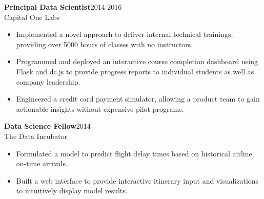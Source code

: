 \documentclass[11pt]{res}
\begin{document}
\begin{resume}
{\bf Principal Data Scientist}\hfill\mbox{2014-2016}\\
Capital One Labs
\vspace*{0.01 in}\begin{itemize} \itemsep -2pt 
  \item Implemented a novel approach to deliver internal technical
    trainings, providing over 5000 hours of classes with no instructors.
  \item Programmed and deployed an interactive course completion dashboard using Flask
    and dc.js to provide progress reports to individual students as
    well as company leadership.
  \item Engineered a credit card payment simulator, allowing a product team
    to gain actionable insights without expensive pilot programs.
  \end{itemize}
\vspace{-0.15in}

{\bf Data Science Fellow}\hfill\mbox{2014}\\
The Data Incubator
                  \vspace* {0.01 in}\begin{itemize} \itemsep -2pt
                    \item Formulated a model to predict flight
                      delay times based on
                      historical airline on-time arrivals.
                    \item Built a web interface to provide interactive itinerary
                      input and visualizations to intuitively
                      display model results.
                    \end{itemize}
\vspace{-0.15in}


\end{resume}
\end{document}
